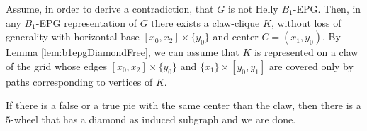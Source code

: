 \documentclass[9pt]{entcs}
\begin{document}
\begin{pf}
Assume, in order to derive a contradiction, that $G$ is not  Helly $B_1$-EPG.
Then, in any $B_1$-EPG representation of $G$ there exists a claw-clique $K$, without loss of generality with  horizontal base $[x_0, x_2]\times\{y_0\}$ and center $C = (x_1, y_0)$. By Lemma \ref{lem:b1epgDiamondFree},
we can assume that $K$ is represented on a claw of the grid whose edges $[x_0, x_2]\times\{y_0\}$ and $\{x_1\}\times[y_0, y_1]$ are covered only by paths corresponding to vertices of $K$.


If there is a false or a true pie with the same center than the claw, then there is a $5$-wheel that has a diamond as induced subgraph and we are done.  %

\end{pf}
\end{document}
